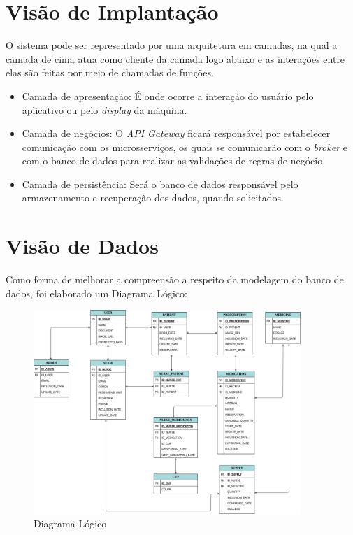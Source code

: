 \begin{apendicesenv}

\section{Visão de Implantação}

O sistema pode ser representado por uma arquitetura em camadas, na qual a camada de cima atua como cliente da camada logo abaixo e as interações entre elas são
feitas por meio de chamadas de funções.


\begin{itemize}
    \item Camada de apresentação: É onde ocorre a interação do usuário pelo aplicativo ou pelo \textit{display} da máquina.
    \item Camada de negócios: O \textit{API Gateway} ficará responsável por  estabelecer comunicação com os microsserviços, os quais se comunicarão com o \emph{broker} e com o banco de dados para realizar as validações de regras de negócio.
    \item Camada de persistência: Será o banco de dados responsável pelo armazenamento e recuperação dos dados, quando solicitados.
\end{itemize}

\section{Visão de Dados}

Como forma de melhorar a compreensão a respeito da modelagem do banco de dados, foi elaborado um Diagrama Lógico:

\begin{figure}[H]
    \centering
    \includegraphics[width=0.9\textwidth]{figuras/software/database.png}
    \caption{Diagrama Lógico}
    \label{fig:der_apdc}
\end{figure}


\end{apendicesenv}
